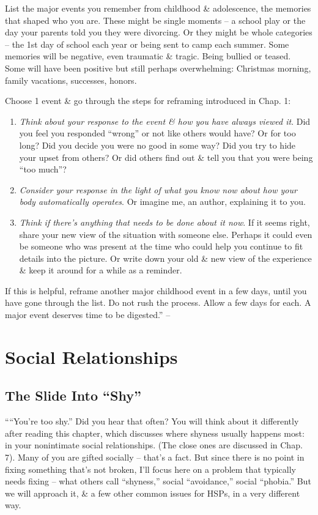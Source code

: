 \documentclass{article}
\numberwithin{equation}{section}
\begin{document}
List the major events you remember from childhood \& adolescence, the memories that shaped who you are. These might be single moments -- a school play or the day your parents told you they were divorcing. Or they might be whole categories -- the 1st day of school each year or being sent to camp each summer. Some memories will be negative, even traumatic \& tragic. Being bullied or teased. Some will have been positive but still perhaps overwhelming: Christmas morning, family vacations, successes, honors.

Choose 1 event \& go through the steps for reframing introduced in Chap. 1:
\begin{enumerate}
	\item \textit{Think about your response to the event \& how you have always viewed it}. Did you feel you responded ``wrong'' or not like others would have? Or for too long? Did you decide you were no good in some way? Did you try to hide your upset from others? Or did others find out \& tell you that you were being ``too much''?
	\item \textit{Consider your response in the light of what you know now about how your body automatically operates}. Or imagine me, an author, explaining it to you.
	\item \textit{Think if there's anything that needs to be done about it now}. If it seems right, share your new view of the situation with someone else. Perhaps it could even be someone who was present at the time who could help you continue to fit details into the picture. Or write down your old \& new view of the experience \& keep it around for a while as a reminder.
\end{enumerate}
If this is helpful, reframe another major childhood event in a few days, until you have gone through the list. Do not rush the process. Allow a few days for each. A major event deserves time to be digested.'' -- \cite[pp. 120--121]{Aron2013}


\section{Social Relationships}

\subsection{The Slide Into ``Shy''}
````You're too shy.'' Did you hear that often? You will think about it differently after reading this chapter, which discusses where shyness usually happens most: in your nonintimate social relationships. (The close ones are discussed in Chap. 7). Many of you are gifted socially -- that's a fact. But since there is no point in fixing something that's not broken, I'll focus here on a problem that typically needs fixing -- what others call ``shyness,'' social ``avoidance,'' social ``phobia.'' But we will approach it, \& a few other common issues for HSPs, in a very different way.
\end{document}

